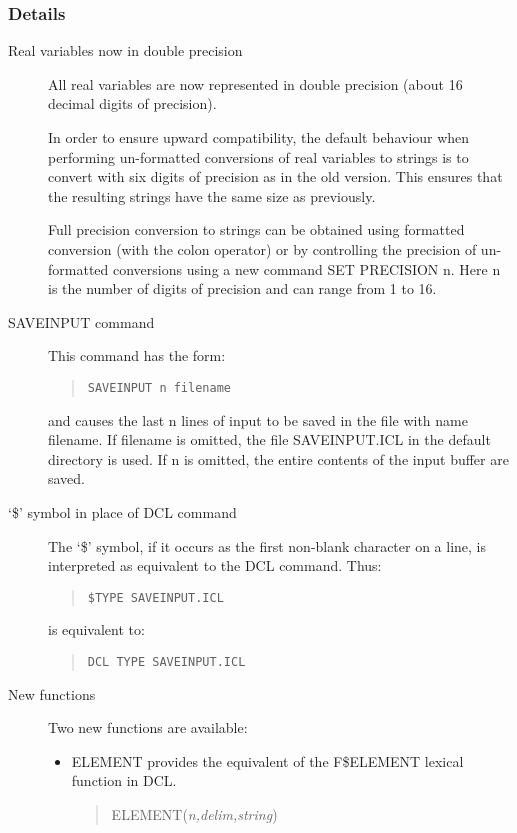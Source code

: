 \subsubsection{Details}                                                        
\begin{description}
\item[Real variables now in double precision]
All real variables are now represented in double precision (about 16
decimal digits of precision). 

In order to ensure upward compatibility, the default behaviour when performing
un-formatted conversions of real variables to strings is to convert with six
digits of precision as in the old version. This ensures that the resulting
strings have the same size as previously.

Full precision conversion to strings can be obtained using formatted conversion
(with the colon operator) or by controlling the precision of un-formatted
conversions using a new command SET PRECISION n. Here n is the number of digits
of precision and can range from 1 to 16.

\item[SAVEINPUT command]
This command has the form:
\begin{quote}
\begin{verbatim}
SAVEINPUT n filename
\end{verbatim}
\end{quote}
and causes the last n lines of input to be saved in the file with name
filename. If filename is omitted, the file SAVEINPUT.ICL in the default
directory is used. If n is omitted, the entire contents of the input buffer
are saved.

\item[`\$' symbol in place of DCL command]
The `\$' symbol, if it occurs as the first non-blank character on a line, is
interpreted as equivalent to the DCL command. Thus:
\begin{quote}
\begin{verbatim}
$TYPE SAVEINPUT.ICL
\end{verbatim}
\end{quote}
is equivalent to:
\begin{quote}
\begin{verbatim}
DCL TYPE SAVEINPUT.ICL
\end{verbatim}
\end{quote}

\item[New functions]
Two new functions are available:
\begin{itemize}
\item ELEMENT provides the equivalent of the F\$ELEMENT lexical function in DCL.
\begin{quote}
ELEMENT({\em n,delim,string})
\end{quote}


\end{itemize}
\end{description}
